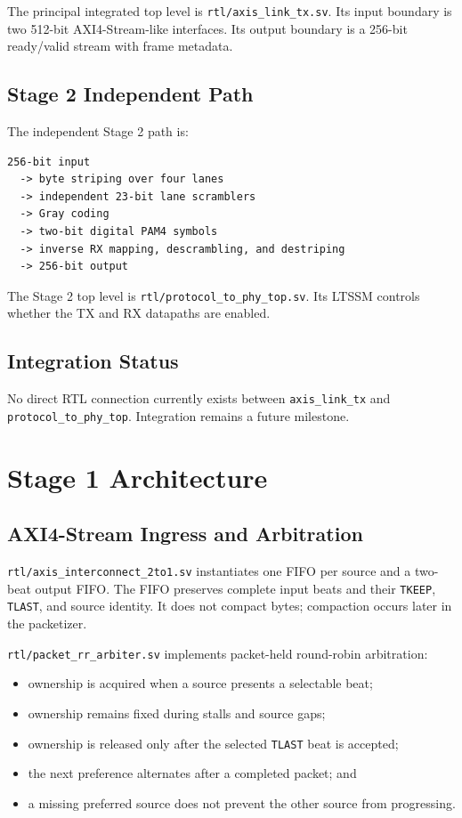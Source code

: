 \documentclass[11pt,a4paper]{article}
\newcommand{\code}[1]{\texttt{#1}}
\begin{document}
The principal integrated top level is \code{rtl/axis\_link\_tx.sv}. Its input boundary is
two 512-bit AXI4-Stream-like interfaces. Its output boundary is a 256-bit ready/valid
stream with frame metadata.

\subsection{Stage 2 Independent Path}
The independent Stage 2 path is:

\begin{verbatim}
256-bit input
  -> byte striping over four lanes
  -> independent 23-bit lane scramblers
  -> Gray coding
  -> two-bit digital PAM4 symbols
  -> inverse RX mapping, descrambling, and destriping
  -> 256-bit output
\end{verbatim}

The Stage 2 top level is \code{rtl/protocol\_to\_phy\_top.sv}. Its LTSSM controls whether
the TX and RX datapaths are enabled.

\subsection{Integration Status}
No direct RTL connection currently exists between \code{axis\_link\_tx} and
\code{protocol\_to\_phy\_top}. Integration remains a future milestone.

\section{Stage 1 Architecture}

\subsection{AXI4-Stream Ingress and Arbitration}
\code{rtl/axis\_interconnect\_2to1.sv} instantiates one FIFO per source and a two-beat
output FIFO. The FIFO preserves complete input beats and their \code{TKEEP}, \code{TLAST},
and source identity. It does not compact bytes; compaction occurs later in the packetizer.

\code{rtl/packet\_rr\_arbiter.sv} implements packet-held round-robin arbitration:

\begin{itemize}[leftmargin=*]
    \item ownership is acquired when a source presents a selectable beat;
    \item ownership remains fixed during stalls and source gaps;
    \item ownership is released only after the selected \code{TLAST} beat is accepted;
    \item the next preference alternates after a completed packet; and
    \item a missing preferred source does not prevent the other source from progressing.
\end{itemize}
\end{document}
